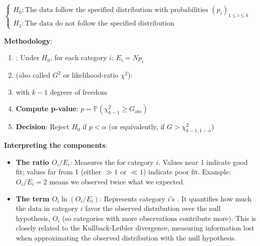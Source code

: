 $\begin{cases}
    H_{0}: \text{The data follow the specified distribution with probabilities } \left(p_i\right)_{1\leq i\leq k}\\
    H_{1}: \text{The data do not follow the specified distribution}
\end{cases}$

\textbf{Methodology}:
\begin{enumerate}
    \item {}: Under $H_0$, for each category $i$: $E_i = Np_i$

    \item {} (also called $G^2$ or likelihood-ratio $\chi^2$):
        \begin{center}
        \end{center}

    \item {} with $k-1$ degrees of freedom

    \item \textbf{Compute p-value}: $p = \mathbb{P}(\chi^2_{k-1} \geq G_{obs})$

    \item \textbf{Decision}: Reject $H_0$ if $p < \alpha$ (or equivalently, if $G > \chi^2_{k-1, 1-\alpha}$)
\end{enumerate}

\textbf{Interpreting the components}:
\begin{itemize}
    \item \textbf{The ratio $O_i/E_i$}: Measures the  for category $i$.
        Values near 1 indicate good fit; values far from 1 (either $\gg 1$ or $\ll 1$) indicate poor fit.
        Example: $O_i/E_i = 2$ means we observed twice what we expected.
    \item \textbf{The term $O_i\ln(O_i/E_i)$}: Represents category $i$'s .
        It quantifies how much the data in category $i$ favor the observed distribution over the null hypothesis,
         $O_i$ (so categories with more observations contribute more).
        This is closely related to the Kullback-Leibler divergence, measuring information lost when approximating
        the observed distribution with the null hypothesis.
\end{itemize}

